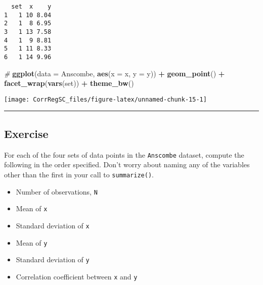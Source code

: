\documentclass[
]{book}
\newenvironment{Shaded}{\begin{snugshade}}{\end{snugshade}}
\newcommand{\CommentTok}[1]{\textcolor[rgb]{0.56,0.35,0.01}{\textit{#1}}}
\newcommand{\DataTypeTok}[1]{\textcolor[rgb]{0.13,0.29,0.53}{#1}}
\newcommand{\KeywordTok}[1]{\textcolor[rgb]{0.13,0.29,0.53}{\textbf{#1}}}
\newcommand{\NormalTok}[1]{#1}
\newcommand{\OperatorTok}[1]{\textcolor[rgb]{0.81,0.36,0.00}{\textbf{#1}}}
\newcommand{\StringTok}[1]{\textcolor[rgb]{0.31,0.60,0.02}{#1}}
\begin{document}
\begin{verbatim}
  set  x    y
1   1 10 8.04
2   1  8 6.95
3   1 13 7.58
4   1  9 8.81
5   1 11 8.33
6   1 14 9.96
\end{verbatim}

\begin{Shaded}
\begin{Highlighting}[]
\CommentTok{#}
\KeywordTok{ggplot}\NormalTok{(}\DataTypeTok{data =}\NormalTok{ Anscombe, }\KeywordTok{aes}\NormalTok{(}\DataTypeTok{x =}\NormalTok{ x, }\DataTypeTok{y =}\NormalTok{ y)) }\OperatorTok{+}
\StringTok{  }\KeywordTok{geom_point}\NormalTok{() }\OperatorTok{+}
\StringTok{  }\KeywordTok{facet_wrap}\NormalTok{(}\KeywordTok{vars}\NormalTok{(set)) }\OperatorTok{+}\StringTok{ }
\StringTok{  }\KeywordTok{theme_bw}\NormalTok{()}
\end{Highlighting}
\end{Shaded}

\begin{center}\texttt{[image: CorrRegSC\_files/figure-latex/unnamed-chunk-15-1]} \end{center}

\begin{center}\rule{0.5\linewidth}{0.5pt}\end{center}

\hypertarget{exercise-6}{%
\subsection*{Exercise}\label{exercise-6}}

For each of the four sets of data points in the \texttt{Anscombe} dataset, compute the following in the order specified. Don't worry about naming any of the variables other than the first in your call to \texttt{summarize()}.

\begin{itemize}
\item
  Number of observations, \texttt{N}
\item
  Mean of \texttt{x}
\item
  Standard deviation of \texttt{x}
\item
  Mean of \texttt{y}
\item
  Standard deviation of \texttt{y}
\item
  Correlation coefficient between \texttt{x} and \texttt{y}
\end{itemize}

\begin{Shaded}
\end{Shaded}
\end{document}

